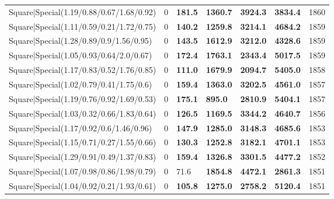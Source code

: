 \begin{tabular}{lrllllr}
 Square|Special(1.19/0.88/0.67/1.68/0.92)                      &             0   & \textbf{181.5} & \textbf{1360.7} & \textbf{3924.3} & \textbf{3834.4} &         1860 \\
 Square|Special(1.11/0.59/0.21/1.72/0.75)                      &             0   & \textbf{140.2} & \textbf{1259.8} & \textbf{3214.1} & \textbf{4684.2} &         1859 \\
 Square|Special(1.28/0.89/0.9/1.56/0.95)                       &             0   & \textbf{143.5} & \textbf{1612.9} & \textbf{3212.0} & \textbf{4328.6} &         1859 \\
 Square|Special(1.05/0.93/0.64/2.0/0.67)                       &             0   & \textbf{172.4} & \textbf{1763.1} & \textbf{2343.4} & \textbf{5017.5} &         1859 \\
 Square|Special(1.17/0.83/0.52/1.76/0.85)                      &             0   & \textbf{111.0} & \textbf{1679.9} & \textbf{2094.7} & \textbf{5405.0} &         1858 \\
 Square|Special(1.02/0.79/0.41/1.75/0.6)                       &             0   & \textbf{159.4} & \textbf{1363.0} & \textbf{3202.5} & \textbf{4561.0} &         1857 \\
 Square|Special(1.19/0.76/0.92/1.69/0.53)                      &             0   & \textbf{175.1} & \textbf{895.0}  & \textbf{2810.9} & \textbf{5404.1} &         1857 \\
 Square|Special(1.03/0.32/0.66/1.83/0.64)                      &             0   & \textbf{126.5} & \textbf{1169.5} & \textbf{3344.2} & \textbf{4640.7} &         1856 \\
 Square|Special(1.17/0.92/0.6/1.46/0.96)                       &             0   & \textbf{147.9} & \textbf{1285.0} & \textbf{3148.3} & \textbf{4685.6} &         1853 \\
 Square|Special(1.15/0.71/0.27/1.55/0.66)                      &             0   & \textbf{130.3} & \textbf{1252.8} & \textbf{3182.1} & \textbf{4701.1} &         1853 \\
 Square|Special(1.29/0.91/0.49/1.37/0.83)                      &             0   & \textbf{159.4} & \textbf{1326.8} & \textbf{3301.5} & \textbf{4477.2} &         1852 \\
 Square|Special(1.07/0.98/0.86/1.98/0.79)                      &             0   & 71.6           & \textbf{1854.8} & \textbf{4472.1} & \textbf{2861.3} &         1851 \\
 Square|Special(1.04/0.92/0.21/1.93/0.61)                      &             0   & \textbf{105.8} & \textbf{1275.0} & \textbf{2758.2} & \textbf{5120.4} &         1851 \\

\end{tabular}
